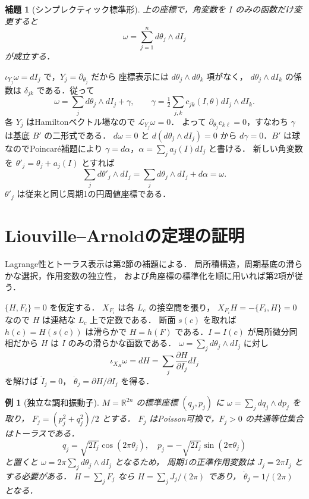 \documentclass[a5paper,10pt,onecolumn]{jsarticle}
\makeatletter
\theoremstyle{mathnotetheorem}
\newtheorem{lemma}[theorem]{補題}
\newtheorem{example}[theorem]{例}
\renewcommand{\proofname}{証明}
\renewenvironment{proof}[1][\proofname]{%
  \par\pushQED{\qed}\normalfont\topsep4\p@\@plus2\p@\relax
  \trivlist\item[\hskip\labelsep\bfseries #1]\ignorespaces
}{\popQED\endtrivlist\@endpefalse}
\makeatother
\begin{document}
\begin{lemma}[シンプレクティック標準形]
上の座標で，角変数を $I$ のみの函数だけ変更すると
\[
 \omega=\sum_{j=1}^n d\theta_j\wedge dI_j
\]
が成立する．
\end{lemma}
\begin{proof}
$\iota_{Y_j}\omega=dI_j$ で，$Y_j=\partial_{\theta_j}$ だから
座標表示には $d\theta_j\wedge d\theta_k$ 項がなく，
$d\theta_j\wedge dI_k$ の係数は $\delta_{jk}$ である．従って
\[
 \omega=\sum_jd\theta_j\wedge dI_j+\gamma,
 \qquad\gamma=\tfrac12\sum_{j,k}c_{jk}(I,\theta)dI_j\wedge dI_k.
\]
各 $Y_j$ はHamiltonベクトル場なので $\mathcal L_{Y_j}\omega=0$．
よって $\partial_{\theta_j}c_{k\ell}=0$，すなわち
$\gamma$ は基底 $B'$ の二形式である．
$d\omega=0$ と $d(d\theta_j\wedge dI_j)=0$ から
$d\gamma=0$．$B'$ は球なのでPoincar\'e補題により
$\gamma=d\alpha$，$\alpha=\sum_j a_j(I)dI_j$ と書ける．
新しい角変数を $\theta'_j=\theta_j+a_j(I)$ とすれば
\[
 \sum_jd\theta'_j\wedge dI_j
 =\sum_jd\theta_j\wedge dI_j+d\alpha=\omega.
\]
$\theta'_j$ は従来と同じ周期1の円周値座標である．
\end{proof}

\section{Liouville--Arnoldの定理の証明}
\begin{proof}[Liouville--Arnoldの定理の証明]
Lagrange性とトーラス表示は第2節の補題による．
局所積構造，周期基底の滑らかな選択，作用変数の独立性，
および角座標の標準化を順に用いれば第2項が従う．

$\{H,F_i\}=0$ を仮定する．
$X_{F_i}$ は各 $L_c$ の接空間を張り，
$X_{F_i}H=-\{F_i,H\}=0$ なので $H$ は連結な $L_c$ 上で定数である．
断面 $s(c)$ を取れば $h(c)=H(s(c))$ は滑らかで
$H=h(F)$ である．$I=I(c)$ が局所微分同相だから
$H$ は $I$ のみの滑らかな函数である．
$\omega=\sum_jd\theta_j\wedge dI_j$ に対し
\[
 \iota_{X_H}\omega=dH=\sum_j\frac{\partial H}{\partial I_j}dI_j
\]
を解けば $\dot I_j=0$，
$\dot\theta_j=\partial H/\partial I_j$ を得る．
\end{proof}

\begin{example}[独立な調和振動子]
$M=\mathbb R^{2n}$ の標準座標 $(q_j,p_j)$ に
$\omega=\sum_jdq_j\wedge dp_j$ を取り，
$F_j=(p_j^2+q_j^2)/2$ とする．
$F_j$ はPoisson可換で，$F_j>0$ の共通等位集合はトーラスである．
\[
 q_j=\sqrt{2I_j}\cos(2\pi\theta_j),\quad
 p_j=-\sqrt{2I_j}\sin(2\pi\theta_j)
\]
と置くと
$\omega=2\pi\sum_jd\theta_j\wedge dI_j$ となるため，
周期1の正準作用変数は $J_j=2\pi I_j$ とする必要がある．
$H=\sum_jF_j$ なら $H=\sum_jJ_j/(2\pi)$ であり，
$\dot\theta_j=1/(2\pi)$ となる．
\end{example}
\end{document}
